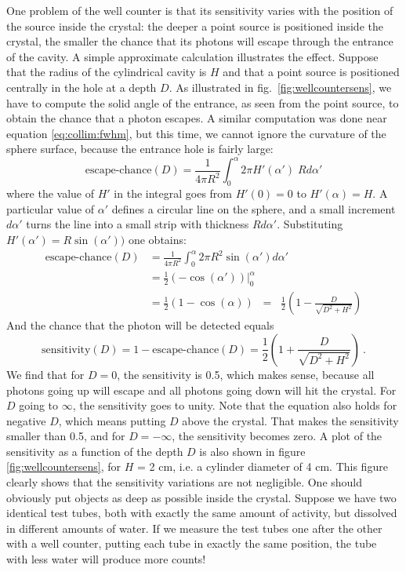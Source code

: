 \documentclass[11pt,oneside]{article}
\begin{document}
One problem of the well counter is that its sensitivity varies with
the position of the source inside the crystal: the deeper a point
source is positioned inside the crystal, the smaller the chance that
its photons will escape through the entrance of the cavity. A simple
approximate calculation illustrates the effect. Suppose that the
radius of the cylindrical cavity is $H$ and that a point source is
positioned centrally in the hole at a depth $D$. As illustrated in
fig.\ \ref{fig:wellcountersens}, we have to compute the solid angle of
the entrance, as seen from the point source, to obtain the chance that
a photon escapes. A similar computation was done near equation
\eqref{eq:collim:fwhm}, but this time, we cannot ignore the curvature
of the sphere surface, because the entrance hole is fairly large:
\begin{equation}
 \mbox{escape-chance}(D)
  = \frac{1}{4\pi R^2}\int_0^\alpha 2\pi H'(\alpha') \; R d\alpha'
\end{equation}
where the value of $H'$ in the integral goes from $H'(0) = 0$ to
$H'(\alpha) = H$. A particular value of $\alpha'$ defines a circular
line on the sphere, and a small increment $d \alpha'$ turns the line
into a small strip with thickness $R d \alpha'$.
%
Substituting $H'(\alpha') = R \sin(\alpha'))$ one
obtains:
\begin{align}
  \mbox{escape-chance}(D)
 &= \frac{1}{4\pi R^2}\int_0^\alpha 2\pi R^2 \sin(\alpha') d\alpha' \nonumber\\
 &=  \frac{1}{2} \left. (- \cos(\alpha')) \right|_0^\alpha \nonumber\\
 &=  \frac{1}{2} (1 - \cos(\alpha)) 
     \;\; = \;\; \frac{1}{2}\left(1 - \frac{D}{\sqrt{D^2 + H^2}}\right)
     \label{eq:wellcounter}
\end{align}
And the chance that the photon will be detected equals
\begin{equation}
  \mbox{sensitivity}(D) = 1 - \mbox{escape-chance}(D) = \frac{1}{2}\left(1 + \frac{D}{\sqrt{D^2 + H^2}}\right) \ . 
  \label{eq:wellcountersens}
\end{equation}
We find that for $D = 0$, the sensitivity is 0.5, which makes sense,
because all photons going up will escape and all photons going down
will hit the crystal. For $D$ going to $\infty$, the sensitivity goes
to unity. Note that the equation also holds for negative $D$, which
means putting $D$ above the crystal. That makes the sensitivity
smaller than 0.5, and for $D = -\infty$, the sensitivity becomes zero.
A plot of the sensitivity as a function of the depth $D$ is also shown
in figure \ref{fig:wellcountersens}, for $H$ = 2 cm, i.e. a cylinder
diameter of 4 cm. This figure clearly shows that the sensitivity
variations are not negligible. One should obviously put objects as
deep as possible inside the crystal. Suppose we have two identical
test tubes, both with exactly the same amount of activity, but
dissolved in different amounts of water. If we measure the test tubes
one after the other with a well counter, putting each tube in exactly
the same position, the tube with less water will produce more counts!
\end{document}
